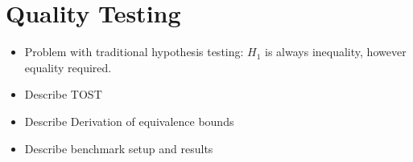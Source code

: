 \section{Quality Testing}

\begin{itemize}
    \item Problem with traditional hypothesis testing: $H_1$ is always inequality, however equality required.
    \item Describe TOST
    \item Describe Derivation of equivalence bounds
    \item Describe benchmark setup and results
\end{itemize}